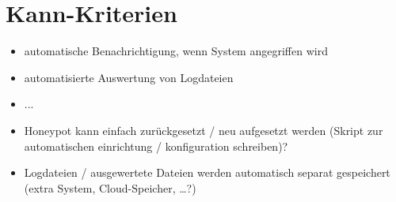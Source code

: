 \section{Kann-Kriterien}
\label{subsec:Kann-Kriterien}
\begin{itemize}
\item automatische Benachrichtigung, wenn System angegriffen wird
\item automatisierte Auswertung von Logdateien
\item ...
\item Honeypot kann einfach zurückgesetzt / neu aufgesetzt werden (Skript zur automatischen einrichtung / konfiguration schreiben)?
\item Logdateien / ausgewertete Dateien werden automatisch separat gespeichert (extra System, Cloud-Speicher, …?)
\end{itemize}


